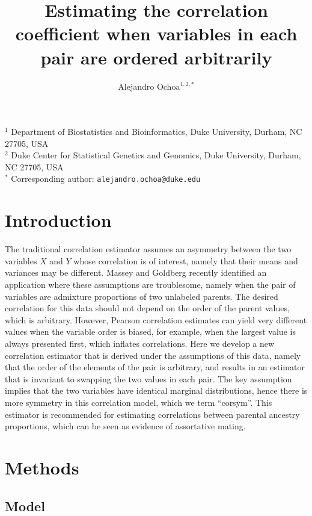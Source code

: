 \documentclass[11pt]{article}
\title{\Large \textbf{Estimating the correlation coefficient when variables in each pair are ordered arbitrarily}}
\author{Alejandro Ochoa$^{1,2,*}$}
\date{}
\begin{document}
\maketitle

\noindent
$^1$ Department of Biostatistics and Bioinformatics, Duke University, Durham, NC 27705, USA \\
$^2$ Duke Center for Statistical Genetics and Genomics, Duke University, Durham, NC 27705, USA \\
$^*$ Corresponding author: \texttt{alejandro.ochoa@duke.edu}



\section{Introduction}

The traditional correlation estimator assumes an asymmetry between the two variables $X$ and $Y$ whose correlation is of interest, namely that their means and variances may be different.
Massey and Goldberg recently identified an application where these assumptions are troublesome, namely when the pair of variables are admixture proportions of two unlabeled parents.
The desired correlation for this data should not depend on the order of the parent values, which is arbitrary.
However, Pearson correlation estimates can yield very different values when the variable order is biased, for example, when the largest value is always presented first, which inflates correlations.
Here we develop a new correlation estimator that is derived under the assumptions of this data, namely that the order of the elements of the pair is arbitrary, and results in an estimator that is invariant to swapping the two values in each pair.
The key assumption implies that the two variables have identical marginal distributions, hence there is more symmetry in this correlation model, which we term ``corsym''.
This estimator is recommended for estimating correlations between parental ancestry proportions, which can be seen as evidence of assortative mating.

\section{Methods}

\subsection{Model}
\end{document}
